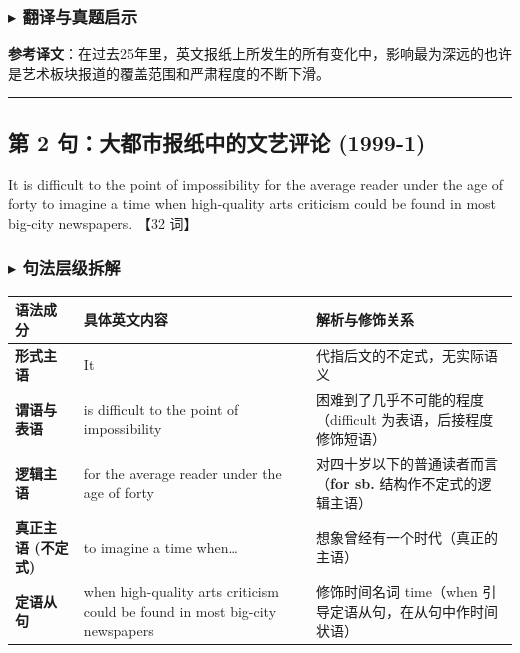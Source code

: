 \documentclass[cn,normal,11pt]{elegantnote}
\begin{document}
\subsubsection*{$\blacktriangleright$ 翻译与真题启示}
\begin{remark}
  \textbf{参考译文}：在过去25年里，英文报纸上所发生的所有变化中，影响最为深远的也许是艺术板块报道的覆盖范围和严肃程度的不断下滑。
\end{remark}

\par\vspace{10pt}\hrule\vspace{10pt}

\subsection{第 2 句：大都市报纸中的文艺评论 (1999-1)}

\begin{note}
  It is difficult to the point of impossibility for the average reader under the age of forty to imagine a time when high-quality arts criticism could be found in most big-city newspapers. 【32 词】
\end{note}

\subsubsection*{$\blacktriangleright$ 句法层级拆解}
\noindent
\begin{tabularx}{\textwidth}{p{3.2cm} X X}
  \toprule
  \textbf{语法成分} & \textbf{具体英文内容} & \textbf{解析与修饰关系} \\
  \midrule
  \textbf{形式主语} & It & 代指后文的不定式，无实际语义 \\
  \midrule
  \textbf{谓语与表语} & is difficult to the point of impossibility & 困难到了几乎不可能的程度（difficult 为表语，后接程度修饰短语） \\
  \midrule
  \textbf{逻辑主语} & for the average reader under the age of forty & 对四十岁以下的普通读者而言（\textbf{for sb.} 结构作不定式的逻辑主语） \\
  \midrule
  \textbf{真正主语 (不定式)} & to imagine a time when… & 想象曾经有一个时代（真正的主语） \\
  \midrule
  \textbf{定语从句} & when high-quality arts criticism could be found in most big-city newspapers & 修饰时间名词 time（when 引导定语从句，在从句中作时间状语） \\
  \bottomrule
\end{tabularx}
\end{document}
